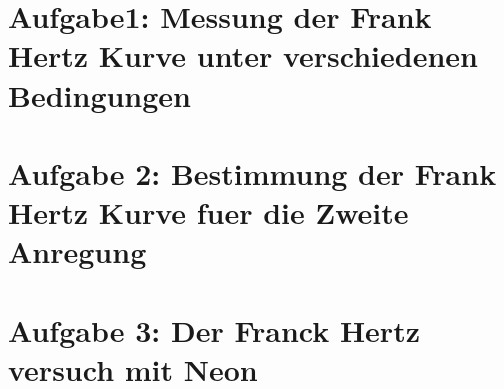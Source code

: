 \documentclass{include/protokollclass}
\begin{document}
\FrontMatter


\begingroup \let\clearpage\relax    %
\tableofcontents                    %
\listoffigures
\listoftables
\endgroup



\MainMatter
\chapter{Aufgabe1: Messung der Frank Hertz Kurve unter verschiedenen Bedingungen}
\chapter{Aufgabe 2: Bestimmung der Frank Hertz Kurve fuer die Zweite Anregung}

\chapter{Aufgabe 3: Der Franck Hertz versuch mit Neon}

%



\TheBibliography




\end{document}
